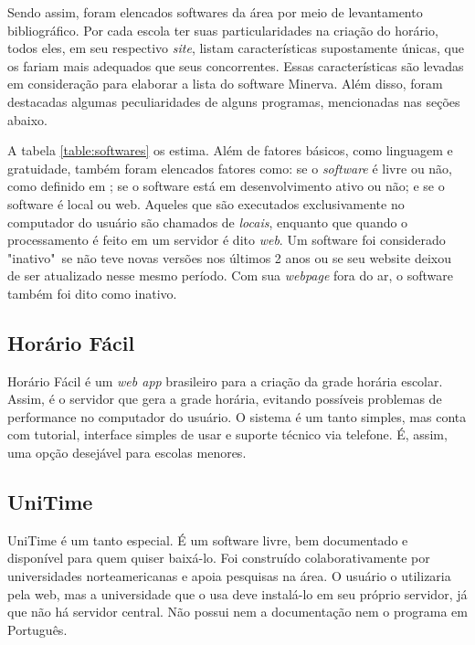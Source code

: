 \documentclass[12pt,a4paper]{article}
\begin{document}
		\par Sendo assim, foram elencados softwares da área por meio de levantamento bibliográfico. Por cada escola ter suas particularidades na criação do horário, todos eles, em seu respectivo \textit{site}, listam características supostamente únicas, que os fariam mais adequados que seus concorrentes. Essas características são levadas em consideração para elaborar a lista do software Minerva. Além disso, foram destacadas algumas peculiaridades de alguns programas, mencionadas nas seções abaixo.

		\par A tabela \ref{table:softwares} os estima. Além de fatores básicos, como linguagem e gratuidade, também foram elencados fatores como: se o \textit{software} é livre ou não, como definido em \cite{publico}; se o software está em desenvolvimento ativo ou não; e se o software é local ou web. Aqueles que são executados exclusivamente no computador do usuário são chamados de \textit{locais}, enquanto que quando o processamento é feito em um servidor é dito \textit{web}. Um software foi considerado "inativo"\, se não teve novas versões nos últimos 2 anos ou se seu website deixou de ser atualizado nesse mesmo período. Com sua \textit{webpage} fora do ar, o software também foi dito como inativo.

		\subsection{Horário Fácil}

			\par Horário Fácil é um \textit{web app} brasileiro para a criação da grade horária escolar. Assim, é o servidor que gera a grade horária, evitando possíveis problemas de performance no computador do usuário. O sistema é um tanto simples, mas conta com tutorial, interface simples de usar e suporte técnico via telefone. É, assim, uma opção desejável para escolas menores.

		\subsection{UniTime}

			\par UniTime é um tanto especial. É um software livre, bem documentado e disponível para quem quiser baixá-lo. Foi construído colaborativamente por universidades norteamericanas e apoia pesquisas na área. O usuário o utilizaria pela web, mas a universidade que o usa deve instalá-lo em seu próprio servidor, já que não há servidor central. Não possui nem a documentação nem o programa em Português.
\end{document}
